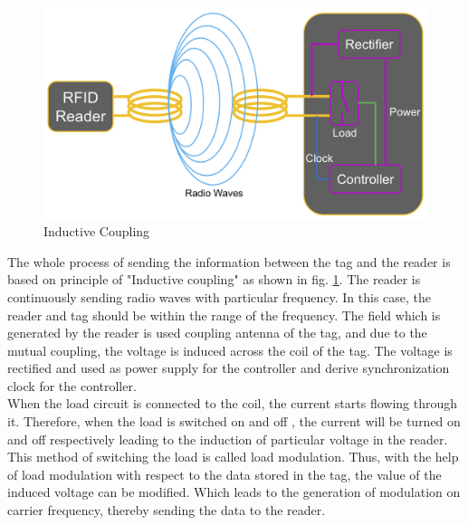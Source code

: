 \begin{figure}[!htbp]
	\centering
	\includegraphics[width = 13cm]{Pictures/rfidtotag}
	\caption{Inductive Coupling}
	\label{rfid_to_tag}
\end{figure}
The whole process of sending the information between the tag and the reader is based on principle of "Inductive coupling" as shown in fig. \ref{rfid_to_tag}.
The reader is continuously sending radio waves with particular frequency. In this case, the reader and tag should be within the range of the frequency. The field which is generated by the reader is used coupling antenna of the tag, and due to the mutual coupling, the voltage is induced across the coil of the tag. The voltage is rectified and used as power supply for the controller and derive synchronization clock for the controller.\\
When the load circuit is connected to the coil, the current starts flowing through it. Therefore, when the load is switched on and off , the current will be turned on and off respectively leading to the induction of particular voltage in the reader. This method of switching the load is called load modulation. Thus, with the help of load modulation with respect to the data stored in the tag, the value of the induced voltage can be modified. Which leads to the generation of modulation on carrier frequency, thereby sending the data to the reader.\\


